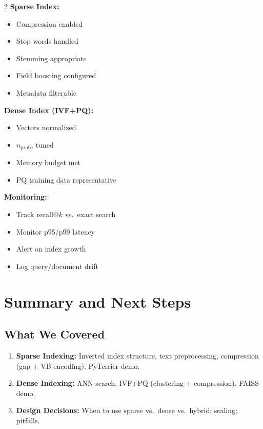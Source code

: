 \documentclass[11pt,a4paper]{article}
\theoremstyle{definition}
\theoremstyle{plain}
\begin{document}
\begin{multicols}{2}
\textbf{Sparse Index:}
\begin{itemize}[label=$\square$,nosep]
    \item Compression enabled
    \item Stop words handled
    \item Stemming appropriate
    \item Field boosting configured
    \item Metadata filterable
\end{itemize}

\textbf{Dense Index (IVF+PQ):}
\begin{itemize}[label=$\square$,nosep]
    \item Vectors normalized
    \item $n_{\mathrm{probe}}$ tuned
    \item Memory budget met
    \item PQ training data representative
\end{itemize}

\columnbreak

\textbf{Monitoring:}
\begin{itemize}[label=$\square$,nosep]
    \item Track recall@$k$ vs.\ exact search
    \item Monitor p95/p99 latency
    \item Alert on index growth
    \item Log query/document drift
\end{itemize}
\end{multicols}

\section{Summary and Next Steps}
\label{sec:summary}

\subsection{What We Covered}

\begin{enumerate}
    \item \textbf{Sparse Indexing:} Inverted index structure, text preprocessing, compression (gap + VB encoding), PyTerrier demo.
    \item \textbf{Dense Indexing:} ANN search, IVF+PQ (clustering + compression), FAISS demo.
    \item \textbf{Design Decisions:} When to use sparse vs.\ dense vs.\ hybrid; scaling; pitfalls.
\end{enumerate}
\end{document}

